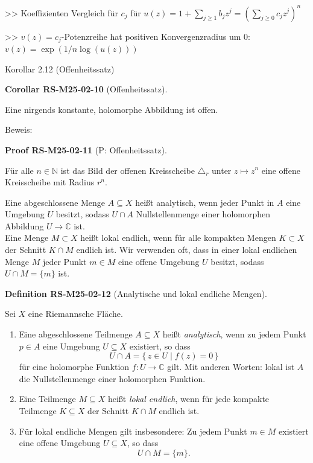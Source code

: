 \documentclass[10pt, letterpaper]{article}
\newcommand{\C}{\mathbb{C}}
\newcommand{\CustomHeading}[3]{%
  \par\medskip\noindent%
  \textbf{#1 #2} \textnormal{(#3)}.\enskip%
}
\newenvironment{DEF}[2]{\begin{unitbox}\CustomHeading{Definition}{#1}{#2}}{\end{unitbox}}
\newenvironment{KORO}[2]{\begin{unitbox}\CustomHeading{Corollar}{#1}{#2}}{\end{unitbox}}
\newenvironment{PROOF}[2]{\begin{unitbox}\CustomHeading{Proof}{#1}{#2}}{\end{unitbox}}
\begin{document}
>> Koeffizienten Vergleich für $c_j$ für $u(z)=1+\sum_{j\geq 1}b_jz^j=(\sum_{j\geq 0}c_jz^j)^n$

>> $v(z)=c_j$-Potenzreihe hat positiven Konvergenzradius um $0$: $v(z)=\exp(1/n\log(u(z)))$




Korollar 2.12 (Offenheitssatz) 

\begin{KORO}{RS-M25-02-10}{Offenheitssatz}
Eine nirgends konstante, holomorphe Abbildung ist offen.
\end{KORO}

Beweis: 

\begin{PROOF}{RS-M25-02-11}{P: Offenheitssatz}
Für alle $n \in \mathbb{N}$ ist das Bild der offenen Kreisscheibe $\triangle_{r}$ unter $z \longmapsto z^{n}$ eine offene Kreisscheibe mit Radius $r^{n}$.
\end{PROOF}

Eine abgeschlossene Menge $A \subseteq X$ heißt analytisch, wenn jeder Punkt in $A$ eine Umgebung $U$ besitzt, sodass $U \cap A$ Nullstellenmenge einer holomorphen Abbildung $U \longrightarrow \mathbb{C}$ ist.\\
Eine Menge $M \subset X$ heißt lokal endlich, wenn für alle kompakten Mengen $K \subset X$ der Schnitt $K \cap M$ endlich ist. Wir verwenden oft, dass in einer lokal endlichen Menge $M$ jeder Punkt $m \in M$ eine offene Umgebung $U$ besitzt, sodass $U \cap M=\{m\}$ ist.



\begin{DEF}{RS-M25-02-12}{Analytische und lokal endliche Mengen}
Sei $X$ eine Riemannsche Fläche.
\begin{enumerate}[label=(\alph*)]
\item Eine abgeschlossene Teilmenge $A\subseteq X$ heißt \emph{analytisch},  
wenn zu jedem Punkt $p\in A$ eine Umgebung $U\subseteq X$ existiert,  
so dass
\[
U\cap A = \{\, z\in U \mid f(z)=0 \,\}
\]
für eine holomorphe Funktion $f:U\to\C$ gilt.  
Mit anderen Worten: lokal ist $A$ die Nullstellenmenge einer holomorphen Funktion.

\item Eine Teilmenge $M\subseteq X$ heißt \emph{lokal endlich},  
wenn für jede kompakte Teilmenge $K\subseteq X$ der Schnitt $K\cap M$ endlich ist.

\item Für lokal endliche Mengen gilt insbesondere:  
Zu jedem Punkt $m\in M$ existiert eine offene Umgebung $U\subseteq X$,  
so dass
\[
U\cap M=\{m\}.
\]
\end{enumerate}
\end{DEF}
\end{document}
